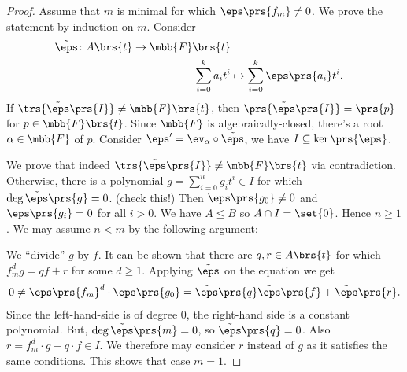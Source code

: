 \documentclass[10pt,a4paper,twoside,openany,hidelinks]{book}
\begin{document}
\begin{proof}
Assume that $m$ is minimal for which $\eps\prs{f_m} \neq 0$. We prove the statement by induction on $m$.
Consider
\begin{align*}
\tilde{\eps} \colon A\brs{t} \to \mbb{F}\brs{t} \\
\sum_{i = 0}^k a_i t^i &\mapsto \sum_{i = 0}^k \eps\prs{a_i} t^i \text{.}
\end{align*}
If
$\trs{\tilde{\eps}\prs{I}} \neq \mbb{F}\brs{t}$, then $\prs{\tilde{\eps}\prs{I}} = \prs{p}$ for $p \in \mbb{F}\brs{t}$. Since $\mbb{F}$ is algebraically-closed, there's a root $\alpha \in \mbb{F}$ of $p$. Consider
$\eps' = \ev_\alpha \circ \tilde{\eps}$, we have $I \subseteq \ker\prs{\eps}$.

We prove that indeed $\trs{\tilde{\eps}\prs{I}} \neq \mbb{F}\brs{t}$ via contradiction. Otherwise, there is a polynomial
$g = \sum_{i=0}^n g_i t^i \in I$
for which $\deg \tilde{\eps}\prs{g} = 0$. (check this!)
Then $\eps\prs{g_0} \neq 0$ and $\eps\prs{g_i} = 0$ for all $i > 0$.
We have $A \leq B$ so $A \cap I = \set{0}$. Hence $n \geq 1$. We may assume $n<m$ by the following argument:

We ``divide'' $g$ by $f$. It can be shown that there are $q,r \in A\brs{t}$ for which $f_m^d g  = qf + r$ for some $d \geq 1$. Applying $\tilde{\eps}$ on the  equation we get
\begin{align*}
0 \neq \eps\prs{f_m}^d \cdot \eps\prs{g_0} = \tilde{\eps}\prs{q}\tilde{\eps}\prs{f} + \tilde{\eps}\prs{r} \text{.}
\end{align*}
Since the left-hand-side is of degree $0$, the right-hand side is a constant polynomial. But, $\deg \tilde{\eps}\prs{m} = 0$, so $\tilde{\eps}\prs{q} = 0$. Also $r = f_m^d \cdot g - q \cdot f \in I$. We therefore may consider $r$ instead of $g$ as it satisfies the same conditions. This shows that case $m = 1$.


\end{proof}
\end{document}
